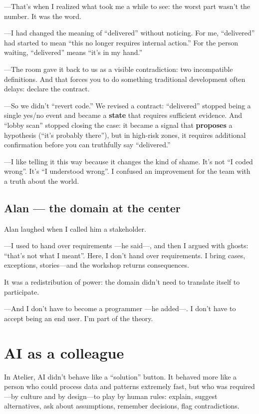 \documentclass[11pt,a4paper]{article}
\begin{document}
---That's when I realized what took me a while to see: the worst part wasn't
the number. It was the word.

---I had changed the meaning of ``delivered'' without noticing. For me,
``delivered'' had started to mean ``this no longer requires internal
action.'' For the person waiting, ``delivered'' means ``it's in my hand.''

---The room gave it back to us as a visible contradiction: two incompatible
definitions. And that forces you to do something traditional development
often delays: declare the contract.

---So we didn't ``revert code.'' We revised a contract: ``delivered'' stopped
being a single yes/no event and became a \textbf{state} that requires
sufficient evidence. And ``lobby scan'' stopped closing the case: it became a
signal that \textbf{proposes} a hypothesis (``it's probably there''), but in
high-risk zones, it requires additional confirmation before you can
truthfully say ``delivered.''

---I like telling it this way because it changes the kind of shame. It's not
``I coded wrong''. It's ``I understood wrong''. I confused an improvement for
the team with a truth about the world.

\subsection{Alan --- the domain at the center}

Alan laughed when I called him a stakeholder.

---I used to hand over requirements ---he said---, and then I argued with
ghosts: ``that's not what I meant''. Here, I don't hand over requirements. I
bring cases, exceptions, stories---and the workshop returns consequences.

It was a redistribution of power: the domain didn't need to translate itself
to participate.

---And I don't have to become a programmer ---he added---. I don't have to
accept being an end user. I'm part of the theory.

\section{AI as a colleague}

In Atelier, AI didn't behave like a ``solution'' button. It behaved more like
a person who could process data and patterns extremely fast, but who was
required---by culture and by design---to play by human rules: explain,
suggest alternatives, ask about assumptions, remember decisions, flag
contradictions.
\end{document}
